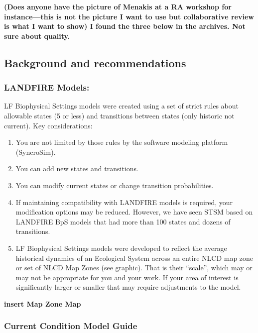 \documentclass[
]{article}
\begin{document}
\textbf{(Does anyone have the picture of Menakis at a RA workshop for
instance---this is not the picture I want to use but collaborative
review is what I want to show) I found the three below in the archives.
Not sure about quality.}

\hypertarget{background-and-recommendations}{%
\subsection{Background and
recommendations}\label{background-and-recommendations}}

\hypertarget{landfire-models}{%
\subsubsection{LANDFIRE Models:}\label{landfire-models}}

LF Biophysical Settings models were created using a set of strict rules
about allowable states (5 or less) and transitions between states (only
historic not current). Key considerations:

\begin{enumerate}
\def\labelenumi{\arabic{enumi}.}
\item
  You are not limited by those rules by the software modeling platform
  (SyncroSim).
\item
  You can add new states and transitions.
\item
  You can modify current states or change transition probabilities.
\item
  If maintaining compatibility with LANDFIRE models is required, your
  modification options may be reduced. However, we have seen STSM based
  on LANDFIRE BpS models that had more than 100 states and dozens of
  transitions.
\item
  LF Biophysical Settings models were developed to reflect the average
  historical dynamics of an Ecological System across an entire NLCD map
  zone or set of NLCD Map Zones (see graphic). That is their ``scale'',
  which may or may not be appropriate for you and your work. If your
  area of interest is significantly larger or smaller that may require
  adjustments to the model.
\end{enumerate}

\textbf{insert Map Zone Map}

\hypertarget{current-condition-model-guide}{%
\subsubsection{Current Condition Model
Guide}\label{current-condition-model-guide}}
\end{document}
